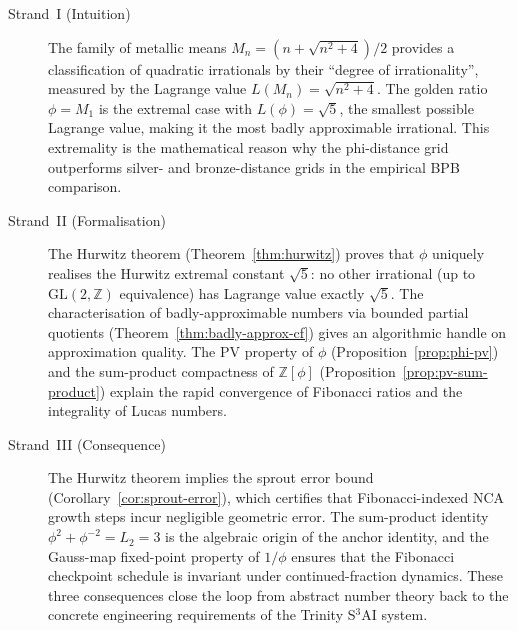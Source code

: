 \begin{description}
  \item[Strand~I (Intuition)] The family of
        metallic means $M_n = (n+\sqrt{n^2+4})/2$
        provides a classification of quadratic
        irrationals by their ``degree of irrationality'',
        measured by the Lagrange value
        $L(M_n) = \sqrt{n^2+4}$.  The golden ratio
        $\phi = M_1$ is the extremal case with
        $L(\phi) = \sqrt{5}$, the smallest possible
        Lagrange value, making it the most badly
        approximable irrational.  This extremality
        is the mathematical reason why the
        phi-distance grid outperforms silver- and
        bronze-distance grids in the empirical
        BPB comparison.

  \item[Strand~II (Formalisation)] The Hurwitz
        theorem (Theorem~\ref{thm:hurwitz}) proves
        that $\phi$ uniquely realises the Hurwitz
        extremal constant $\sqrt{5}$: no other
        irrational (up to $\mathrm{GL}(2,\mathbb{Z})$
        equivalence) has Lagrange value exactly
        $\sqrt{5}$.  The characterisation of
        badly-approximable numbers via bounded
        partial quotients (Theorem~\ref{thm:badly-approx-cf})
        gives an algorithmic handle on
        approximation quality.  The PV property
        of $\phi$ (Proposition~\ref{prop:phi-pv})
        and the sum-product compactness of
        $\mathbb{Z}[\phi]$ (Proposition~\ref{prop:pv-sum-product})
        explain the rapid convergence of Fibonacci
        ratios and the integrality of Lucas numbers.

  \item[Strand~III (Consequence)] The Hurwitz
        theorem implies the sprout error bound
        (Corollary~\ref{cor:sprout-error}), which
        certifies that Fibonacci-indexed NCA growth
        steps incur negligible geometric error.
        The sum-product identity
        $\phi^2 + \phi^{-2} = L_2 = 3$
        is the algebraic origin of the anchor
        identity, and the Gauss-map fixed-point
        property of $1/\phi$ ensures that the
        Fibonacci checkpoint schedule is invariant
        under continued-fraction dynamics.
        These three consequences close the loop
        from abstract number theory back to the
        concrete engineering requirements of the
        Trinity S$^3$AI system.
\end{description}

